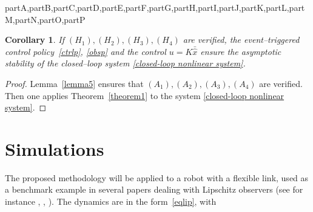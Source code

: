 \documentclass[letterpaper, 10 pt, conference]{ieeeconf}
\def\compile{partA,partB,partC,partD,partE,partF,partG,partH,partI,partJ,partK,partL,partM,partN,partO,partP}
\newenvironment{partP}[1][]{}{}
\newtheorem{corollary}{Corollary}
\begin{document}
\begin{xcomment}{\compile}
\begin{partP}
\medskip
\begin{corollary}
If $(H_1),(H_2),(H_3),(H_4)$ are verified, the event--triggered control policy~\eqref{ctrlp}, \eqref{obsp} and the control $u=K\bar{\hat x}$ ensure the asymptotic stability of the closed--loop system \eqref{closed-loop nonlinear system}.
\end{corollary}

\medskip
\begin{proof} Lemma~\ref{lemma5} ensures that $(A_1),(A_2),(A_3),(A_4)$ are verified. Then one applies Theorem~\ref{theorem1} to the system \eqref{closed-loop  nonlinear system}.
\end{proof}

\section{Simulations} 

The proposed methodology will be applied to a robot with a flexible link, used as a benchmark example in several papers dealing with Lipschitz observers (see for instance \cite{Raghavan 1994}, \cite{Aboky 2002}, \cite{Pagilla 2004}). The dynamics are in the form~\eqref{eqlip}, with


\end{partP}
\end{xcomment}
\end{document}

